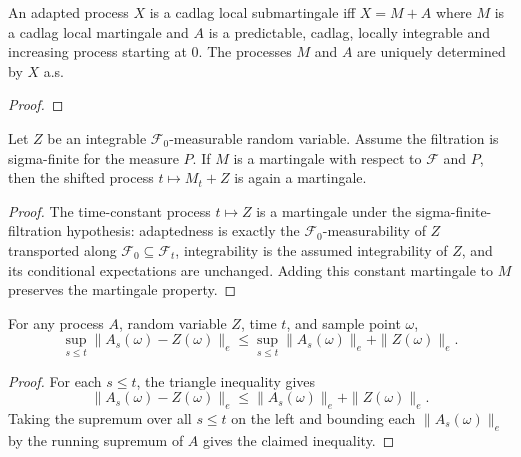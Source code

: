 \begin{theorem}\label{thm:local_doobMeyer}
  \leanok
An adapted process $X$ is a cadlag local submartingale iff $X = M + A$ where $M$ is a cadlag local martingale and $A$ is a predictable, cadlag, locally integrable and increasing process starting at $0$.
The processes $M$ and $A$ are uniquely determined by $X$ a.s.
\end{theorem}

\begin{proof}


\leanok
\end{proof}


\begin{lemma}
  \label{lem:Martingale.add_const_fun}
Let \(Z\) be an integrable \(\mathcal F_0\)-measurable random variable.
Assume the filtration is sigma-finite for the measure \(P\).  If \(M\)
is a martingale with respect to \(\mathcal F\) and \(P\), then the shifted
process \(t \mapsto M_t+Z\) is again a martingale.
\end{lemma}

\begin{proof}
The time-constant process \(t\mapsto Z\) is a martingale under the
sigma-finite-filtration hypothesis: adaptedness is exactly the
\(\mathcal F_0\)-measurability of \(Z\) transported along
\(\mathcal F_0\subseteq\mathcal F_t\), integrability is the assumed
integrability of \(Z\), and its conditional expectations are unchanged.
Adding this constant martingale to \(M\) preserves the martingale
property.
\end{proof}

\begin{lemma}
  \label{lem:runningSup_norm_sub_const_le}
For any process \(A\), random variable \(Z\), time \(t\), and sample
point \(\omega\),
\[
  \sup_{s\le t}\|A_s(\omega)-Z(\omega)\|_e
  \le
  \sup_{s\le t}\|A_s(\omega)\|_e+\|Z(\omega)\|_e .
\]
\end{lemma}

\begin{proof}

\leanok
For each \(s\le t\), the triangle inequality gives
\[
  \|A_s(\omega)-Z(\omega)\|_e
  \le \|A_s(\omega)\|_e+\|Z(\omega)\|_e .
\]
Taking the supremum over all \(s\le t\) on the left and bounding each
\(\|A_s(\omega)\|_e\) by the running supremum of \(A\) gives the claimed
inequality.
\end{proof}

